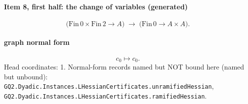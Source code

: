 \paragraph{Item 8, first half: the change of variables (generated)}
\[\bigl(\mathrm{Fin}\,0\times\mathrm{Fin}\,2\to A\bigr)\;\longrightarrow\;\bigl(\mathrm{Fin}\,0\to A\times A\bigr).\]
\paragraph{graph normal form}
\[c_0\mapsto c_0.\]
Head coordinates: 1. Normal-form records named but NOT bound here (named but unbound): \texttt{GQ2.Dyadic.Instances.LHessianCertificates.unramifiedHessian}, \texttt{GQ2.Dyadic.Instances.LHessianCertificates.ramifiedHessian}.
